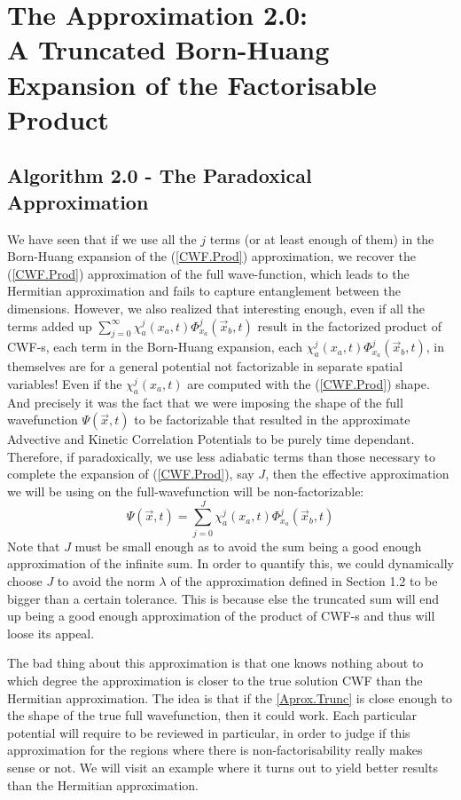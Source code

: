 \documentclass[11pt, a4paper]{article} %
\begin{document}
\section{The Approximation 2.0:\\ A Truncated Born-Huang Expansion of the Factorisable Product}
\subsection{Algorithm 2.0 - The Paradoxical Approximation }
We have seen that if we use all the $j$ terms (or at least enough of them) in the Born-Huang expansion of the (\ref{CWF.Prod}) approximation, we recover the (\ref{CWF.Prod}) approximation of the full wave-function, which leads to the Hermitian approximation and fails to capture entanglement between the dimensions. However, we also realized that interesting enough, even if all the terms added up $\sum_{j=0}^\infty \chi_a^j(x_a,t) \Phi_{x_a}^j(\vec{x}_b,t)$ result in the factorized product of CWF-s, each term in the Born-Huang expansion, each $\chi_a^j(x_a,t) \Phi_{x_a}^j(\vec{x}_b,t)$, in themselves are for a general potential not factorizable in separate spatial variables! Even if the $\chi_a^j(x_a,t)$ are computed with the (\ref{CWF.Prod}) shape. And precisely it was the fact that we were imposing the shape of the full wavefunction $\Psi(\vec{x},t)$ to be factorizable that resulted in the approximate Advective and Kinetic Correlation Potentials to be purely time dependant. Therefore, if paradoxically, we use less adiabatic terms than those necessary to complete the expansion of (\ref{CWF.Prod}), say $J$, then the effective approximation we will be using on the full-wavefunction will be non-factorizable:
\begin{equation}\label{Aprox.Trunc}\tag{Aprox.Trunc}
\Psi(\vec{x},t)=\sum_{j=0}^J \chi_a^j(x_a,t) \Phi_{x_a}^j(\vec{x}_b,t)
\end{equation}
Note that $J$ must be small enough as to avoid the sum being a good enough approximation of the infinite sum. In order to quantify this, we could dynamically choose $J$ to avoid the norm $\lambda$ of the approximation defined in Section 1.2 to be bigger than a certain tolerance. This is because else the truncated sum will end up being a good enough approximation of the product of CWF-s and thus will loose its appeal.

The bad thing about this approximation is that one knows nothing about to which degree the approximation is closer to the true solution CWF than the Hermitian approximation. The idea is that if the \ref{Aprox.Trunc} is close enough to the shape of the true full wavefunction, then it could work. Each particular potential will require to be reviewed in particular, in order to judge if this approximation for the regions where there is non-factorisability really makes sense or not. We will visit an example where it turns out to yield better results than the Hermitian approximation.
\end{document}
